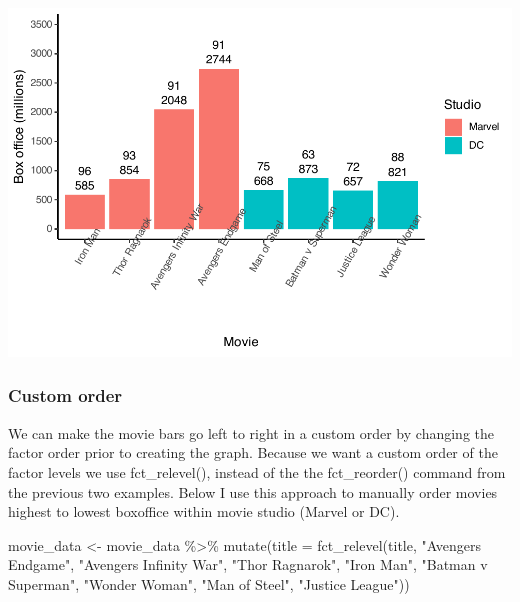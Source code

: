 \documentclass[
]{krantz}
\makeatletter
\newenvironment{Shaded}{\begin{snugshade}}{\end{snugshade}}
\newcommand{\AttributeTok}[1]{\textcolor[rgb]{0.61,0.61,0.61}{#1}}
\newcommand{\FunctionTok}[1]{\textcolor[rgb]{0,0,0}{#1}}
\newcommand{\NormalTok}[1]{#1}
\newcommand{\OtherTok}[1]{\textcolor[rgb]{0.37,0.37,0.37}{#1}}
\newcommand{\SpecialCharTok}[1]{\textcolor[rgb]{0,0,0}{#1}}
\newcommand{\StringTok}[1]{\textcolor[rgb]{0.5,0.5,0.5}{#1}}
\newenvironment{kframe}{%
\medskip{}
\setlength{\fboxsep}{.8em}
 \def\at@end@of@kframe{}%
 \ifinner\ifhmode%
  \def\at@end@of@kframe{\end{minipage}}%
  \begin{minipage}{\columnwidth}%
 \fi\fi%
 \def\FrameCommand##1{\hskip\@totalleftmargin \hskip-\fboxsep
 \colorbox{shadecolor}{##1}\hskip-\fboxsep
     \hskip-\linewidth \hskip-\@totalleftmargin \hskip\columnwidth}%
 \MakeFramed {\advance\hsize-\width
   \@totalleftmargin\z@ \linewidth\hsize
   \@setminipage}}%
 {\par\unskip\endMakeFramed%
 \at@end@of@kframe}
\renewenvironment{Shaded}{\begin{kframe}}{\end{kframe}}
\makeatother
\begin{document}
\includegraphics[width=0.65\linewidth]{bookdown_files/figure-latex/unnamed-chunk-130-1}

\hypertarget{custom-order}{%
\subsubsection{Custom order}\label{custom-order}}

We can make the movie bars go left to right in a custom order by changing the factor order prior to creating the graph. Because we want a custom order of the factor levels we use fct\_relevel(), instead of the the fct\_reorder() command from the previous two examples. Below I use this approach to manually order movies highest to lowest boxoffice within movie studio (Marvel or DC).

\begin{Shaded}
\begin{Highlighting}[]
\NormalTok{movie\_data }\OtherTok{\textless{}{-}}\NormalTok{ movie\_data }\SpecialCharTok{\%\textgreater{}\%} 
  \FunctionTok{mutate}\NormalTok{(}\AttributeTok{title =} \FunctionTok{fct\_relevel}\NormalTok{(title,}
                             \StringTok{"Avengers Endgame"}\NormalTok{,}
                             \StringTok{"Avengers Infinity War"}\NormalTok{,}
                             \StringTok{"Thor Ragnarok"}\NormalTok{,}
                             \StringTok{"Iron Man"}\NormalTok{,}
                             \StringTok{"Batman v Superman"}\NormalTok{,}
                             \StringTok{"Wonder Woman"}\NormalTok{,}
                             \StringTok{"Man of Steel"}\NormalTok{,}
                             \StringTok{"Justice League"}\NormalTok{))}
\end{Highlighting}
\end{Shaded}
\end{document}
